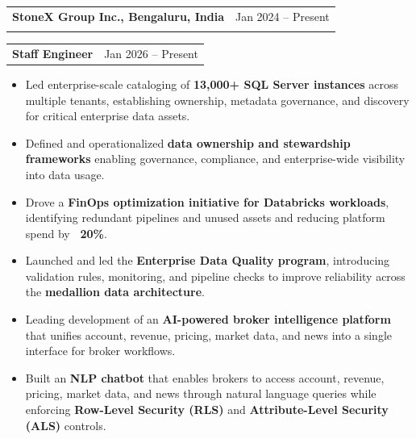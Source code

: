 \documentclass[a4paper,10pt]{article}
\begin{document}
\begin{tabularx}{\linewidth}{@{}Xr@{}}
\textbf{StoneX Group Inc., Bengaluru, India} & Jan 2024 -- Present \\
\vspace{1mm}
\end{tabularx}
\begin{tabularx}{\linewidth}{@{}Xr@{}}
\hspace*{2mm}\textbf{Staff Engineer} & Jan 2026 -- Present \\
\end{tabularx}
\begin{itemize}[topsep=0pt,leftmargin=6mm]
    \item Led enterprise-scale cataloging of \textbf{13,000+ SQL Server instances} across multiple tenants, establishing ownership, metadata governance, and discovery for critical enterprise data assets.
    \item Defined and operationalized \textbf{data ownership and stewardship frameworks} enabling governance, compliance, and enterprise-wide visibility into data usage.
    \item Drove a \textbf{FinOps optimization initiative for Databricks workloads}, identifying redundant pipelines and unused assets and reducing platform spend by \textbf{~20\%}.
    \item Launched and led the \textbf{Enterprise Data Quality program}, introducing validation rules, monitoring, and pipeline checks to improve reliability across the \textbf{medallion data architecture}.
    \item Leading development of an \textbf{AI-powered broker intelligence platform} that unifies account, revenue, pricing, market data, and news into a single interface for broker workflows.
    \item Built an \textbf{NLP chatbot} that enables brokers to access account, revenue, pricing, market data, and news through natural language queries while enforcing \textbf{Row-Level Security (RLS)} and \textbf{Attribute-Level Security (ALS)} controls.
\end{itemize}

\vspace{1mm}
\end{document}
